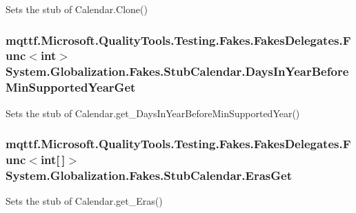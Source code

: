 Sets the stub of Calendar.\-Clone()

\hypertarget{class_system_1_1_globalization_1_1_fakes_1_1_stub_calendar_af108c71360f5428f84367f2e883254bf}{
\subsubsection[{Days\-In\-Year\-Before\-Min\-Supported\-Year\-Get}]{\setlength{\rightskip}{0pt plus 5cm}mqttf.\-Microsoft.\-Quality\-Tools.\-Testing.\-Fakes.\-Fakes\-Delegates.\-Func$<$int$>$ System.\-Globalization.\-Fakes.\-Stub\-Calendar.\-Days\-In\-Year\-Before\-Min\-Supported\-Year\-Get}}\label{class_system_1_1_globalization_1_1_fakes_1_1_stub_calendar_af108c71360f5428f84367f2e883254bf}


Sets the stub of Calendar.\-get\-\_\-\-Days\-In\-Year\-Before\-Min\-Supported\-Year()

\hypertarget{class_system_1_1_globalization_1_1_fakes_1_1_stub_calendar_a369ba962986a00c91ceefa51edab1d08}{
\subsubsection[{Eras\-Get}]{\setlength{\rightskip}{0pt plus 5cm}mqttf.\-Microsoft.\-Quality\-Tools.\-Testing.\-Fakes.\-Fakes\-Delegates.\-Func$<$int\mbox{[}$\,$\mbox{]}$>$ System.\-Globalization.\-Fakes.\-Stub\-Calendar.\-Eras\-Get}}\label{class_system_1_1_globalization_1_1_fakes_1_1_stub_calendar_a369ba962986a00c91ceefa51edab1d08}


Sets the stub of Calendar.\-get\-\_\-\-Eras()

